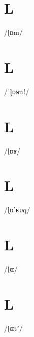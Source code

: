\documentclass[10pt,a4paper,twoside]{book}
\begin{document}
\section*{L}

\begin{multicols}{3}
 {/ɭɒm/} {}
\end{multicols}

\section*{L}

\begin{multicols}{3}
 {/ˈɭɒɴuǃ/} {}
\end{multicols}

\section*{L}

\begin{multicols}{3}
 {/ɭɒʁ/} {}
\end{multicols}

\section*{L}

\begin{multicols}{3}
 {/ɭɒˈʁɒq/} {}
\end{multicols}

\section*{L}

\begin{multicols}{3}
 {/ɭɶ/} {}
\end{multicols}

\section*{L}

\begin{multicols}{3}
 {/ɭɶtʼ/} {}
\end{multicols}
\end{document}
